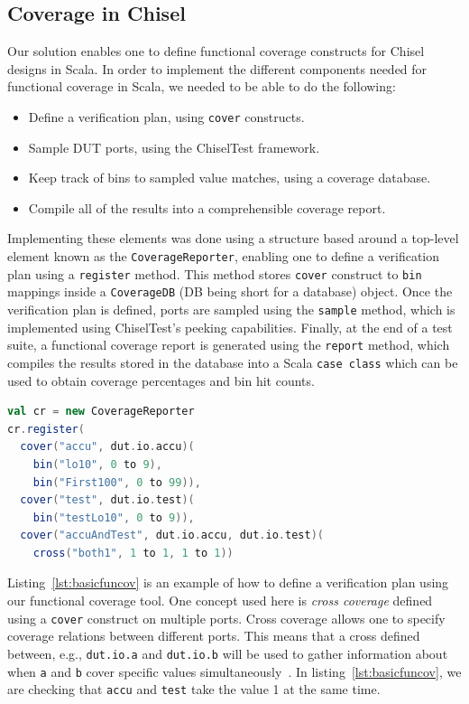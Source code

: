 \documentclass[conference]{IEEEtran}
\begin{document}
\subsection{Coverage in Chisel}
Our solution enables one to define functional coverage constructs for Chisel designs in Scala.
In order to implement the different components needed for functional coverage in Scala, we needed to be able to do the following:

\begin{itemize}
  \item Define a verification plan, using \texttt{cover} constructs.
  \item Sample DUT ports, using the ChiselTest framework.
  \item Keep track of bins to sampled value matches, using a coverage database.
  \item Compile all of the results into a comprehensible coverage report.
\end{itemize}

Implementing these elements was done using a structure based around a top-level element known as the \texttt{CoverageReporter}, enabling one to define a verification plan using a \texttt{register} method. 
This method stores \texttt{cover} construct to \texttt{bin} mappings inside a \texttt{CoverageDB} (DB being short for a database) object. 
Once the verification plan is defined, ports are sampled using the \texttt{sample} method, which is implemented using ChiselTest's peeking capabilities. 
Finally, at the end of a test suite, a functional coverage report is generated using the \texttt{report} method, which compiles the results stored in the database into a Scala \texttt{case class} which can be used to obtain coverage percentages and bin hit counts.

\begin{lstlisting}[captionpos=b,caption={Small Verification Plan defined using 3 \texttt{cover} constructs, including one cross coverage construct},label={lst:basicfuncov},language=scala]
val cr = new CoverageReporter
cr.register(
  cover("accu", dut.io.accu)(
    bin("lo10", 0 to 9),
    bin("First100", 0 to 99)),
  cover("test", dut.io.test)(
    bin("testLo10", 0 to 9)),
  cover("accuAndTest", dut.io.accu, dut.io.test)(
    cross("both1", 1 to 1, 1 to 1))
\end{lstlisting}

Listing~\ref{lst:basicfuncov} is an example of how to define a verification plan using our functional coverage tool. 
One concept used here is \textit{cross coverage} defined using a \texttt{cover} construct on multiple ports. 
Cross coverage allows one to specify coverage relations between different ports. 
This means that a cross defined between, e.g., \texttt{dut.io.a} and \texttt{dut.io.b} will be used to gather information about when \texttt{a} and \texttt{b} cover specific values simultaneously~\cite{spear2008systemverilog}.
In listing~\ref{lst:basicfuncov}, we are checking that \texttt{accu} and \texttt{test} take the value 1 at the same time.
\end{document}
